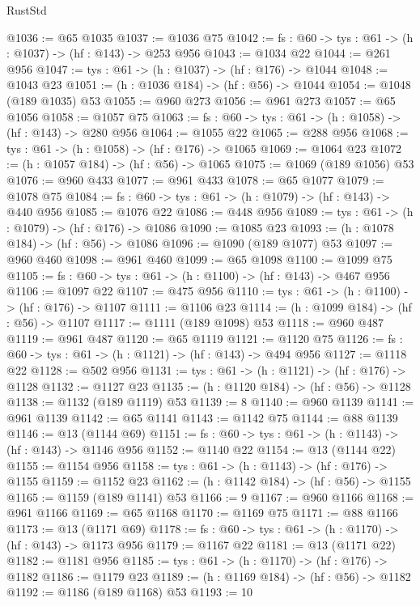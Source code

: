 \begin{lexlean}{RustStd}
\begin{coremodule}
@1036 := @65 @1035
@1037 := @1036 @75
@1042 := {fs : @60} -> {tys : @61} -> (h : @1037) -> (hf : @143) -> @253 @956
@1043 := @1034 @22
@1044 := @261 @956
@1047 := {tys : @61} -> (h : @1037) -> (hf : @176) -> @1044
@1048 := @1043 @23
@1051 := (h : @1036 @184) -> (hf : @56) -> @1044
@1054 := @1048 (@189 @1035) @53
@1055 := @960 @273
@1056 := @961 @273
@1057 := @65 @1056
@1058 := @1057 @75
@1063 := {fs : @60} -> {tys : @61} -> (h : @1058) -> (hf : @143) -> @280 @956
@1064 := @1055 @22
@1065 := @288 @956
@1068 := {tys : @61} -> (h : @1058) -> (hf : @176) -> @1065
@1069 := @1064 @23
@1072 := (h : @1057 @184) -> (hf : @56) -> @1065
@1075 := @1069 (@189 @1056) @53
@1076 := @960 @433
@1077 := @961 @433
@1078 := @65 @1077
@1079 := @1078 @75
@1084 := {fs : @60} -> {tys : @61} -> (h : @1079) -> (hf : @143) -> @440 @956
@1085 := @1076 @22
@1086 := @448 @956
@1089 := {tys : @61} -> (h : @1079) -> (hf : @176) -> @1086
@1090 := @1085 @23
@1093 := (h : @1078 @184) -> (hf : @56) -> @1086
@1096 := @1090 (@189 @1077) @53
@1097 := @960 @460
@1098 := @961 @460
@1099 := @65 @1098
@1100 := @1099 @75
@1105 := {fs : @60} -> {tys : @61} -> (h : @1100) -> (hf : @143) -> @467 @956
@1106 := @1097 @22
@1107 := @475 @956
@1110 := {tys : @61} -> (h : @1100) -> (hf : @176) -> @1107
@1111 := @1106 @23
@1114 := (h : @1099 @184) -> (hf : @56) -> @1107
@1117 := @1111 (@189 @1098) @53
@1118 := @960 @487
@1119 := @961 @487
@1120 := @65 @1119
@1121 := @1120 @75
@1126 := {fs : @60} -> {tys : @61} -> (h : @1121) -> (hf : @143) -> @494 @956
@1127 := @1118 @22
@1128 := @502 @956
@1131 := {tys : @61} -> (h : @1121) -> (hf : @176) -> @1128
@1132 := @1127 @23
@1135 := (h : @1120 @184) -> (hf : @56) -> @1128
@1138 := @1132 (@189 @1119) @53
@1139 := 8
@1140 := @960 @1139
@1141 := @961 @1139
@1142 := @65 @1141
@1143 := @1142 @75
@1144 := @88 @1139
@1146 := @13 (@1144 @69)
@1151 := {fs : @60} -> {tys : @61} -> (h : @1143) -> (hf : @143) -> @1146 @956
@1152 := @1140 @22
@1154 := @13 (@1144 @22)
@1155 := @1154 @956
@1158 := {tys : @61} -> (h : @1143) -> (hf : @176) -> @1155
@1159 := @1152 @23
@1162 := (h : @1142 @184) -> (hf : @56) -> @1155
@1165 := @1159 (@189 @1141) @53
@1166 := 9
@1167 := @960 @1166
@1168 := @961 @1166
@1169 := @65 @1168
@1170 := @1169 @75
@1171 := @88 @1166
@1173 := @13 (@1171 @69)
@1178 := {fs : @60} -> {tys : @61} -> (h : @1170) -> (hf : @143) -> @1173 @956
@1179 := @1167 @22
@1181 := @13 (@1171 @22)
@1182 := @1181 @956
@1185 := {tys : @61} -> (h : @1170) -> (hf : @176) -> @1182
@1186 := @1179 @23
@1189 := (h : @1169 @184) -> (hf : @56) -> @1182
@1192 := @1186 (@189 @1168) @53
@1193 := 10

\end{coremodule}
\end{lexlean}
